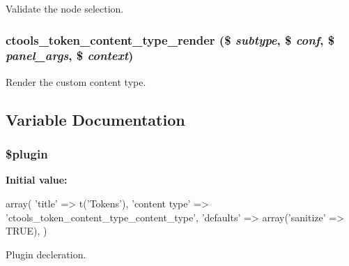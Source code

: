 \label{content__types_2token_2token_8inc_a37930c4b24c45b1463e0659a50e8786b}
Validate the node selection. \hypertarget{content__types_2token_2token_8inc_a1f607523b748a43a0addb1dc3cd85823}{
\subsubsection[{ctools\_\-token\_\-content\_\-type\_\-render}]{\setlength{\rightskip}{0pt plus 5cm}ctools\_\-token\_\-content\_\-type\_\-render (\$ {\em subtype}, \/  \$ {\em conf}, \/  \$ {\em panel\_\-args}, \/  \$ {\em context})}}
\label{content__types_2token_2token_8inc_a1f607523b748a43a0addb1dc3cd85823}
Render the custom content type. 

\subsection{Variable Documentation}
\hypertarget{content__types_2token_2token_8inc_ada8a7130088351710bb02ed622d6bf65}{
\subsubsection[{\$plugin}]{\setlength{\rightskip}{0pt plus 5cm}\$plugin}}
\label{content__types_2token_2token_8inc_ada8a7130088351710bb02ed622d6bf65}
{\bfseries Initial value:}
\begin{DoxyCode}
 array(
  'title' => t('Tokens'),
  'content type' => 'ctools_token_content_type_content_type',
  'defaults' => array('sanitize' => TRUE),
)
\end{DoxyCode}
Plugin decleration. 
